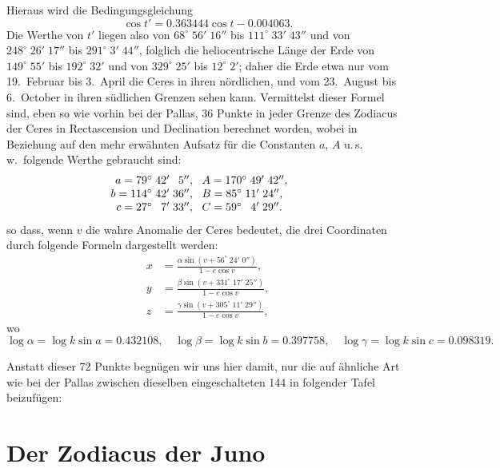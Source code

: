 \documentclass[12pt,a4paper]{article}
\begin{document}
Hieraus wird die Bedingungsgleichung
\[
\cos t' = 0.363444\cos t - 0.004063.
\]
Die Werthe von $t'$ liegen also von $68^{\circ}\;56'\;16''$ bis $111^{\circ}\;33'\;43''$
und von $248^{\circ}\;26'\;17''$ bis $291^{\circ}\;3'\;44''$, folglich die heliocentrische
Länge der Erde von $149^{\circ}\;55'$ bis $192^{\circ}\;32'$ und von $329^{\circ}\;25'$ bis
$12^{\circ}\;2'$; daher die Erde etwa nur vom 19.\ Februar bis 3.\ April die Ceres
in ihren nördlichen, und vom 23.\ August bis 6.\ October in ihren südlichen
Grenzen sehen kann. Vermittelst dieser Formel sind, eben so wie vorhin bei der
Pallas, 36 Punkte in jeder Grenze des Zodiacus der Ceres in Rectascension und
Declination berechnet worden, wobei in Beziehung auf den mehr erwähnten
Aufsatz für die Constanten $a$, $A$ u.\,s.\,w.\ folgende Werthe gebraucht sind:
\[
\begin{array}{r@{\;\;\;}l@{\qquad}r@{\;\;\;}l}
a = 79^{\circ}\;42'\;\phantom{0}5'', & A = 170^{\circ}\;49'\;42'',\\
b = 114^{\circ}\;42'\;36'', & B = 85^{\circ}\;11'\;24'',\\
c = 27^{\circ}\;\phantom{0}7'\;33'', & C = 59^{\circ}\;\phantom{0}4'\;29''.
\end{array}
\]
so dass, wenn $v$ die wahre Anomalie der Ceres bedeutet, die drei Coordinaten
durch folgende Formeln dargestellt werden:
\begin{align*}
x &= \frac{\alpha\sin(v + 56^{\circ}\;24'\;0'')}{1 - e\cos v},\\
y &= \frac{\beta\sin(v + 331^{\circ}\;17'\;25'')}{1 - e\cos v},\\
z &= \frac{\gamma\sin(v + 305^{\circ}\;11'\;29'')}{1 - e\cos v},
\end{align*}
wo
\[
\log\alpha = \log k\sin a = 0.432108,\quad
\log\beta = \log k\sin b = 0.397758,\quad
\log\gamma = \log k\sin c = 0.098319.
\]

Anstatt dieser 72 Punkte begnügen wir uns hier damit, nur die auf ähnliche
Art wie bei der Pallas zwischen dieselben eingeschalteten 144 in folgender
Tafel beizufügen:

\newpage
\section{Der Zodiacus der Juno}
\label{sec:zodiacus_juno}

\end{document}

